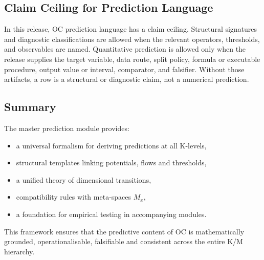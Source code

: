 

\subsection{Claim Ceiling for Prediction Language}
\label{sec:predictions-claim-ceiling-v3}

In this release, OC prediction language has a claim ceiling. Structural
signatures and diagnostic classifications are allowed when the relevant
operators, thresholds, and observables are named. Quantitative prediction is
allowed only when the release supplies the target variable, data route, split
policy, formula or executable procedure, output value or interval, comparator,
and falsifier. Without those artifacts, a row is a structural or diagnostic
claim, not a numerical prediction.

\subsection{Summary}

The master prediction module provides:

\begin{itemize}
    \item a universal formalism for deriving predictions at all K-levels,
    \item structural templates linking potentials, flows and thresholds,
    \item a unified theory of dimensional transitions,
    \item compatibility rules with meta-spaces $M_x$,
    \item a foundation for empirical testing in accompanying modules.
\end{itemize}

This framework ensures that the predictive content of OC  
is mathematically grounded, operationalisable, falsifiable  
and consistent across the entire K/M hierarchy.
